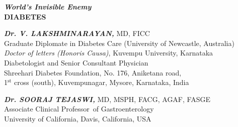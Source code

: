 \thispagestyle{empty}

\begin{center}
\Huge\textbf{\textit{World’s Invisible Enemy}\\ DIABETES}
\end{center}

\vskip 150pt


\begin{center}
{\large\textbf{\textit{Dr. V. LAKSHMINARAYAN,}} MD, FICC\\{\small Graduate Diplomate in Diabetes Care (University of Newcastle, Australia)\\\textit{Doctor of letters (Honoris Causa)}, Kuvempu University, Karnataka\\ Diabetologist and Senior Consultant Physician\\ Shreehari Diabetes Foundation, No. 176, Aniketana road,\\ 1$^{\text{st}}$ cross (south), Kuvempunagar, Mysore, Karnataka, India}}
\end{center}

\vskip 30pt

\begin{center}
{\large\textbf{\textit{Dr. SOORAJ TEJASWI,}} MD, MSPH, FACG, AGAF, FASGE\\{\small Associate Clinical Professor of Gastroenterology\\ University of California, Davis, California, USA}}
\end{center}
